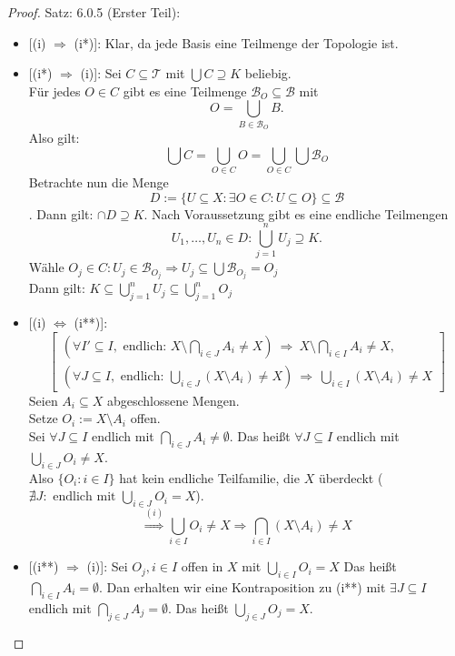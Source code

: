 \begin{proof}{Satz: 6.0.5 (Erster Teil):}\\
    \begin{itemize}
        \item{[(i) $\Rightarrow$ (i*)]}:
        Klar, da jede Basis eine Teilmenge der Topologie ist.
        \item{[(i*) $\Rightarrow$ (i)]}: 
        Sei $C \subseteq \mathcal{T}$ mit $\bigcup C \supseteq K$ beliebig.\\
        Für jedes $O \in C$ gibt es eine Teilmenge 
        $\mathcal{B}_O \subseteq \mathcal{B}$ mit
        $$
            O = \bigcup_{B \in \mathcal{B}_O} B .
        $$
        Also gilt: 
        $$
        \bigcup C = \bigcup_{O \in C} O 
        = \bigcup_{O \in C} \bigcup \mathcal{B}_O
        $$
        Betrachte nun die Menge 
        $$
        D:= \{U\subseteq X: \exists O \in C: U \subseteq O\}\subseteq \mathcal{B}
        $$.
        Dann gilt: $\cap D \supseteq K$.
        Nach Voraussetzung gibt es eine endliche Teilmengen
        $$
        U_1, \ldots, U_n \in D: \bigcup_{j=1}^n U_j \supseteq K.
        $$
        Wähle $O_j \in C : U_j \in \mathcal{B}_{O_j}
        \Rightarrow U_j \subseteq \bigcup \mathcal{B}_{O_j} = O_j $\\
        Dann gilt: 
        $K \subseteq \bigcup_{j=1}^n U_j \subseteq \bigcup_{j=1}^n O_j$

        \item{[(i) $\Leftrightarrow$ (i**)]}:
        $$
        \left[
        \begin{array}{l}
        (\forall I' \subseteq I, \text{ endlich: } X \setminus 
        \bigcap_{i \in J} A_i \ne X)
        \ \Rightarrow\ X \setminus \bigcap_{i \in I} A_i \ne X, \\[0.5em]
        (\forall J \subseteq I, \text{ endlich: } \bigcup_{i \in J} 
        (X \setminus A_i) \ne X)
        \ \Rightarrow\ \bigcup_{i \in I} (X \setminus A_i) \ne X
        \end{array}
        \right]
        $$
        Seien $A_i \subseteq X$ abgeschlossene Mengen.\\
        Setze $O_i := X \setminus A_i$ offen.\\
        Sei $\forall J \subseteq I$ endlich mit 
        $\bigcap_{i \in J} A_i \ne \emptyset$.
        Das heißt $\forall J \subseteq I$ endlich mit
        $ \bigcup_{i \in J} O_i \neq X$.\\
        Also $\{O_i:i\in I\}$ hat kein endliche Teilfamilie,
        die $X$ überdeckt ($\nexists J : \text{ endlich mit } 
        \bigcup_{i \in J} O_i = X$).
        $$
        \overset{(i)}{\Rightarrow} \bigcup_{i \in I} O_i \ne X 
        \Rightarrow \bigcap_{i \in I} (X \setminus A_i) \neq X
        $$
        \item{[(i**) $\Rightarrow$ (i)]}:
        Sei $O_j, i\in I$ offen in $X$ mit $\bigcup_{i \in I} O_i =X$ 
        Das heißt $\bigcap_{i \in I} A_i = \emptyset$.
        Dan erhalten wir eine Kontraposition zu (i**) mit
        $\exists J \subseteq I$ endlich mit
        $\bigcap_{j \in J} A_j = \emptyset$.
        Das heißt $\bigcup_{j \in J} O_j = X$.
    \end{itemize}
\end{proof}

